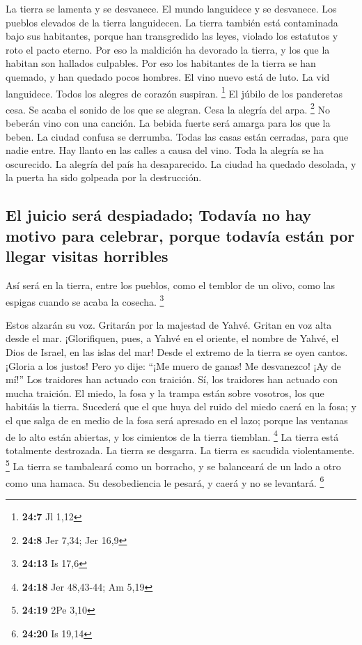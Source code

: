  La tierra se lamenta y se desvanece. El mundo languidece
y se desvanece. Los pueblos elevados de la tierra languidecen.
 La tierra también está contaminada bajo sus habitantes,
porque han transgredido las leyes, violado los estatutos y roto el pacto
eterno.  Por eso la maldición ha devorado la tierra, y los
que la habitan son hallados culpables. Por eso los habitantes de la
tierra se han quemado, y han quedado pocos hombres.  El
vino nuevo está de luto. La vid languidece. Todos los alegres de corazón
suspiran. \footnote{\textbf{24:7} Jl 1,12}  El júbilo de
los panderetas cesa. Se acaba el sonido de los que se alegran. Cesa la
alegría del arpa. \footnote{\textbf{24:8} Jer 7,34; Jer 16,9}
 No beberán vino con una canción. La bebida fuerte será
amarga para los que la beben.  La ciudad confusa se
derrumba. Todas las casas están cerradas, para que nadie entre.
 Hay llanto en las calles a causa del vino. Toda la
alegría se ha oscurecido. La alegría del país ha desaparecido.
 La ciudad ha quedado desolada, y la puerta ha sido
golpeada por la destrucción.

\hypertarget{el-juicio-seruxe1-despiadado-todavuxeda-no-hay-motivo-para-celebrar-porque-todavuxeda-estuxe1n-por-llegar-visitas-horribles}{%
\subsection{El juicio será despiadado; Todavía no hay motivo para
celebrar, porque todavía están por llegar visitas
horribles}\label{el-juicio-seruxe1-despiadado-todavuxeda-no-hay-motivo-para-celebrar-porque-todavuxeda-estuxe1n-por-llegar-visitas-horribles}}

 Así será en la tierra, entre los pueblos, como el
temblor de un olivo, como las espigas cuando se acaba la cosecha.
\footnote{\textbf{24:13} Is 17,6}

 Estos alzarán su voz. Gritarán por la majestad de Yahvé.
Gritan en voz alta desde el mar.  ¡Glorifiquen, pues, a
Yahvé en el oriente, el nombre de Yahvé, el Dios de Israel, en las islas
del mar!  Desde el extremo de la tierra se oyen cantos.
¡Gloria a los justos! Pero yo dije: ``¡Me muero de ganas! Me desvanezco!
¡Ay de mí!'' Los traidores han actuado con traición. Sí, los traidores
han actuado con mucha traición.  El miedo, la fosa y la
trampa están sobre vosotros, los que habitáis la tierra. 
Sucederá que el que huya del ruido del miedo caerá en la fosa; y el que
salga de en medio de la fosa será apresado en el lazo; porque las
ventanas de lo alto están abiertas, y los cimientos de la tierra
tiemblan. \footnote{\textbf{24:18} Jer 48,43-44; Am 5,19}
 La tierra está totalmente destrozada. La tierra se
desgarra. La tierra es sacudida violentamente. \footnote{\textbf{24:19}
  2Pe 3,10}  La tierra se tambaleará como un borracho, y
se balanceará de un lado a otro como una hamaca. Su desobediencia le
pesará, y caerá y no se levantará. \footnote{\textbf{24:20} Is 19,14}


